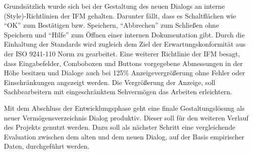 Grundsätzlich wurde sich bei der Gestaltung des neuen Dialogs an interne (Style)-Richtlinien der IFM gehalten. Darunter fällt, dass es Schaltflächen wie \enquote{OK} zum Bestätigen bzw. Speichern, \enquote{Abbrechen} zum Schließen ohne Speichern und \enquote{Hilfe} zum Öffnen einer internen Dokumentation gibt. Durch die Einhaltung der Standards wird zugleich dem Ziel der Erwartungskonformität aus der ISO 9241-110 Norm  zu gearbeitet. Eine weiterer Richtlinie der IFM besagt, dass Eingabefelder, Comboboxen und Buttons vorgegebene Abmessungen in der Höhe besitzen und Dialoge auch bei 125\% Anzeigevergrößerung ohne Fehler oder Einschränkungen angezeigt werden. Die Vergrößerung der Anzeige, soll Sachbearbeitern mit eingeschränktem Sehvermögen das Arbeiten erleichtern.

Mit dem Abschluss der Entwicklungsphase geht eine finale Gestaltungslösung als neuer Vermögensverzeichnis Dialog produktiv. Dieser soll für den weiteren Verlauf des Projekts genutzt werden. Dazu soll als nächster Schritt eine vergleichende Evaluation zwischen dem alten und dem neuen Dialog, auf der Basis empirischer Daten, durchgeführt werden.


